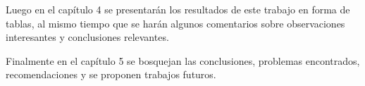 Luego en el capítulo 4 se presentarán los resultados de este trabajo en forma de tablas, al mismo tiempo que se harán algunos comentarios sobre observaciones interesantes y conclusiones relevantes.

Finalmente en el capítulo 5 se bosquejan las conclusiones, problemas encontrados, recomendaciones y se proponen trabajos futuros.


